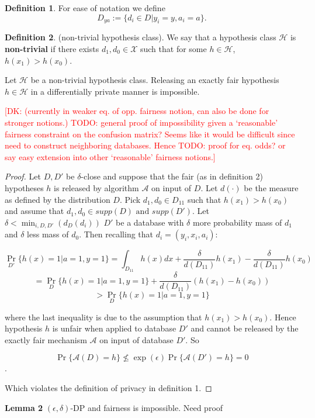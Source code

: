 \documentclass[format = sigconf]{acmart}
\newcommand{\dk}[1]{\textcolor{red}{[DK: #1]}}
\newcommand{\A}{\mathcal{A}}
\renewcommand{\H}{\mathcal{H}}
\newcommand{\1}{\mathbbm{1}}
\theoremstyle{definition}
\newtheorem{defn}{Definition}[section]
\begin{document}
\begin{defn}
	For ease of notation we define
	$$D_{ya} := \{d_i \in D | y_i = y, a_i = a \}.$$
\end{defn}
\begin{defn}
	(non-trivial hypothesis class). We say that a hypothesis class $\H$ is {\bf non-trivial} if there exists $d_1, d_0 \in \mathcal{X}$ such that for some $h \in \H$, $h(x_1) > h(x_0)$.
\end{defn}
\begin{lemma}Let $\mathcal{H}$ be a non-trivial hypothesis class. Releasing an exactly fair hypothesis $h\in \mathcal{H}$ in a differentially private manner is impossible.
\end{lemma}
\dk{ (currently in weaker eq. of opp. fairness notion, can also be done for stronger notions.) TODO: general proof of impossibility given a `reasonable' fairness constraint on the confusion matrix? Seems like it would be difficult since need to construct neighboring databases. Hence TODO: proof for eq. odds? or say easy extension into other `reasonable' fairness notions.}

\begin{proof}
	Let $D, D'$ be $\delta$-close and suppose that the fair (as in definition 2) hypotheses $h$ is released by algorithm $\mathcal{A}$ on input of $D$. Let $d(\cdot)$ be the measure as defined by the distribution $D$. Pick $d_1, d_0 \in D_{11}$ such that $h(x_1) > h(x_0)$ and assume that $d_1, d_0 \in supp(D) \text{ and } supp(D')$. Let $\delta < \min_{i,D,D'}(d_{D}(d_i))$ $D'$ be a database with $\delta$ more probability mass of $d_1$ and $\delta$ less mass of $d_0$. Then recalling that $d_i = (y_i, x_i, a_i)$:

$$\Pr_{D'}\{h(x) = 1 | a = 1, y=1\} = \int_{D_{11}}h(x)dx + \frac{\delta}{d(D_{11})} h(x_1) - \frac{\delta}{d(D_{11})} h(x_0) $$
$$= \Pr_{D}\{h(x) = 1 | a = 1, y=1\} + \frac{\delta}{d(D_{11})} (h(x_1) - h(x_0))$$
$$>  \Pr_{D}\{h(x) = 1 | a = 1, y=1\}$$

where the last inequality is due to the assumption that $h(x_1) > h(x_0)$. Hence hypothesis $h$ is unfair when applied to database $D'$ and cannot be released by the exactly fair mechanism $\A$ on input of database $D'$. So

$$\Pr\{\mathcal{A}(D) = h\} \not\leq \exp(\epsilon)\Pr\{\mathcal{A}(D') = h\} = 0$$.

Which violates the definition of privacy in definition 1.
\end{proof}

{\bf Lemma 2} $(\epsilon, \delta)$-DP and fairness is impossible. Need proof
\end{document}
